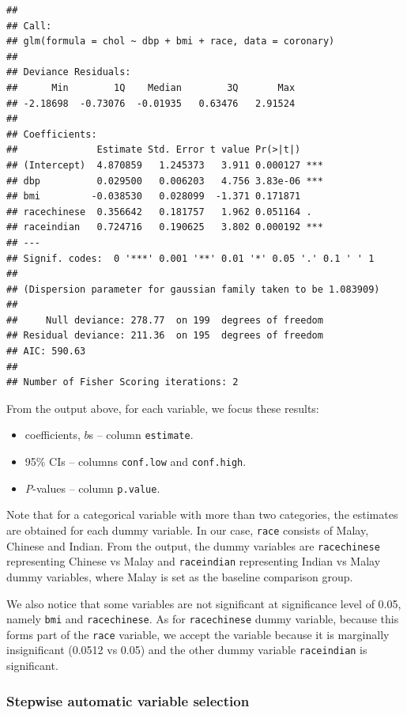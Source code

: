 \documentclass[
  10pt,
]{krantz}
\providecommand{\tightlist}{%
  \setlength{\itemsep}{0pt}\setlength{\parskip}{0pt}}
\begin{document}
\begin{verbatim}
## 
## Call:
## glm(formula = chol ~ dbp + bmi + race, data = coronary)
## 
## Deviance Residuals: 
##      Min        1Q    Median        3Q       Max  
## -2.18698  -0.73076  -0.01935   0.63476   2.91524  
## 
## Coefficients:
##              Estimate Std. Error t value Pr(>|t|)    
## (Intercept)  4.870859   1.245373   3.911 0.000127 ***
## dbp          0.029500   0.006203   4.756 3.83e-06 ***
## bmi         -0.038530   0.028099  -1.371 0.171871    
## racechinese  0.356642   0.181757   1.962 0.051164 .  
## raceindian   0.724716   0.190625   3.802 0.000192 ***
## ---
## Signif. codes:  0 '***' 0.001 '**' 0.01 '*' 0.05 '.' 0.1 ' ' 1
## 
## (Dispersion parameter for gaussian family taken to be 1.083909)
## 
##     Null deviance: 278.77  on 199  degrees of freedom
## Residual deviance: 211.36  on 195  degrees of freedom
## AIC: 590.63
## 
## Number of Fisher Scoring iterations: 2
\end{verbatim}

From the output above, for each variable, we focus these results:

\begin{itemize}
\tightlist
\item
  coefficients, \(b\)s -- column \texttt{estimate}.
\item
  95\% CIs -- columns \texttt{conf.low} and \texttt{conf.high}.
\item
  \emph{P}-values -- column \texttt{p.value}.
\end{itemize}

Note that for a categorical variable with more than two categories, the estimates are obtained for each dummy variable. In our case, \texttt{race} consists of Malay, Chinese and Indian. From the output, the dummy variables are \texttt{racechinese} representing Chinese vs Malay and \texttt{raceindian} representing Indian vs Malay dummy variables, where Malay is set as the baseline comparison group.

We also notice that some variables are not significant at significance level of 0.05, namely \texttt{bmi} and \texttt{racechinese}. As for \texttt{racechinese} dummy variable, because this forms part of the \texttt{race} variable, we accept the variable because it is marginally insignificant (0.0512 vs 0.05) and the other dummy variable \texttt{raceindian} is significant.

\hypertarget{stepwise-automatic-variable-selection}{%
\subsubsection*{\texorpdfstring{Stepwise automatic variable selection}{Stepwise automatic variable selection}}\label{stepwise-automatic-variable-selection}}
\end{document}
